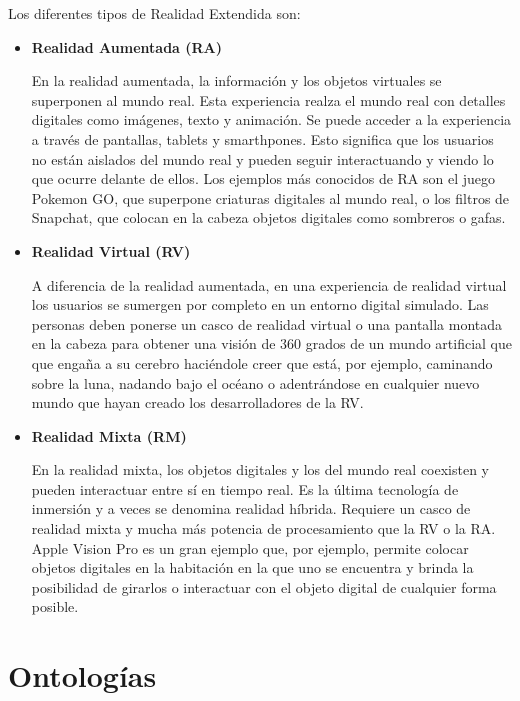 
Los diferentes tipos de Realidad Extendida son:
\begin{itemize}
\item \textbf{Realidad Aumentada (\uppercase{RA})}

En la realidad aumentada, la información y los objetos virtuales se superponen al mundo real.
Esta experiencia realza el mundo real con detalles digitales como imágenes, texto y animación.
Se puede acceder a la experiencia a través de pantallas, tablets y smarthpones.
Esto significa que los usuarios no están aislados del mundo real y pueden seguir interactuando y viendo lo que ocurre delante de ellos. Los ejemplos más conocidos de RA son el juego Pokemon GO, que superpone criaturas digitales al mundo real, o los filtros de Snapchat, que colocan en la cabeza objetos digitales como sombreros o gafas.
\item \textbf{Realidad Virtual (\uppercase{RV})}

A diferencia de la realidad aumentada, en una experiencia de realidad virtual
los usuarios se sumergen por completo en un entorno digital simulado.
Las personas deben ponerse un casco de realidad virtual o una pantalla montada en la cabeza para obtener una visión de 360 grados de un mundo artificial que
que engaña a su cerebro haciéndole creer que está, por ejemplo, caminando sobre la luna, nadando bajo el océano o adentrándose en cualquier nuevo mundo que hayan creado los desarrolladores de la RV.

\item \textbf{Realidad Mixta (\uppercase{RM})}

En la realidad mixta, los objetos digitales y los del mundo real coexisten y pueden interactuar entre sí en tiempo real. Es la última tecnología de inmersión y a veces se denomina realidad híbrida.
Requiere un casco de realidad mixta y mucha más potencia de procesamiento que la RV o la RA. Apple Vision Pro es un gran ejemplo que, por ejemplo, permite colocar objetos digitales en la habitación en la que uno se encuentra y brinda la posibilidad de girarlos o interactuar con el objeto digital de cualquier forma posible.

\end{itemize}

\section{Ontologías}

